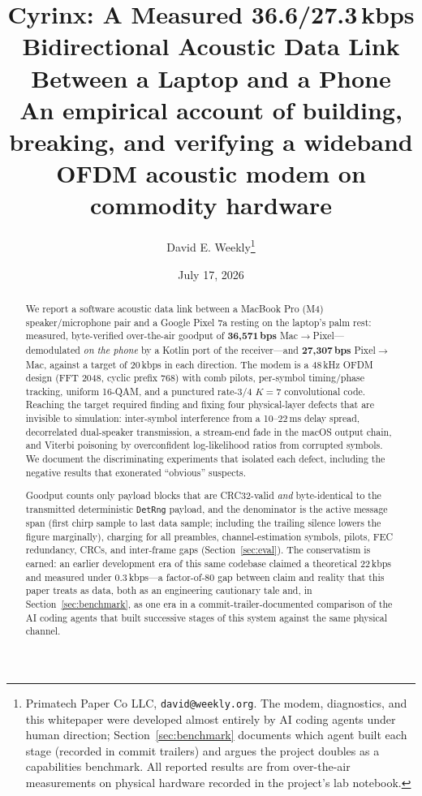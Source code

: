 \documentclass[11pt]{article}
\title{\textbf{Cyrinx: A Measured 36.6/27.3\,kbps Bidirectional Acoustic
Data Link Between a Laptop and a Phone}\\[0.5em]
\large An empirical account of building, breaking, and verifying a wideband
OFDM acoustic modem on commodity hardware}
\author{David E. Weekly\thanks{Primatech Paper Co LLC,
\texttt{david@weekly.org}. The modem, diagnostics, and this whitepaper were
developed almost entirely by AI coding agents under human direction;
Section~\ref{sec:benchmark} documents which agent built each stage (recorded
in commit trailers) and argues the project doubles as a capabilities
benchmark. All reported results are from over-the-air measurements on
physical hardware recorded in the project's lab notebook.}}
\date{July 17, 2026}
\begin{document}
\maketitle

\begin{abstract}
We report a software acoustic data link between a MacBook Pro (M4)
speaker/microphone pair and a Google Pixel 7a resting on the laptop's palm
rest: measured, byte-verified over-the-air goodput of \textbf{36{,}571\,bps}
Mac$\rightarrow$Pixel---demodulated \emph{on the phone} by a Kotlin port of
the receiver---and \textbf{27{,}307\,bps} Pixel$\rightarrow$Mac, against a
target of 20\,kbps in each direction. The modem is a 48\,kHz OFDM design
(FFT 2048, cyclic prefix 768) with comb pilots, per-symbol timing/phase
tracking, uniform 16-QAM, and a punctured rate-3/4 $K{=}7$ convolutional
code. Reaching the target required finding and fixing four physical-layer
defects that are invisible to simulation: inter-symbol interference from a
10--22\,ms delay spread, decorrelated dual-speaker transmission, a
stream-end fade in the macOS output chain, and Viterbi poisoning by
overconfident log-likelihood ratios from corrupted symbols. We document the
discriminating experiments that isolated each defect, including the negative
results that exonerated ``obvious'' suspects.

Goodput counts only payload blocks that are CRC32-valid \emph{and}
byte-identical to the transmitted deterministic \texttt{DetRng} payload, and
the denominator is the active
message span (first chirp sample to last data sample; including the trailing
silence lowers the figure marginally), charging for all preambles,
channel-estimation symbols, pilots, FEC redundancy, CRCs, and inter-frame
gaps (Section~\ref{sec:eval}). The conservatism is earned: an earlier
development era of this same codebase claimed a theoretical 22\,kbps and measured
under 0.3\,kbps---a factor-of-80 gap between claim and reality that this
paper treats as data, both as an engineering cautionary tale and, in
Section~\ref{sec:benchmark}, as one era in a commit-trailer-documented
comparison of the AI coding agents that built successive stages of this
system against the same physical channel.


\end{abstract}
\end{document}
